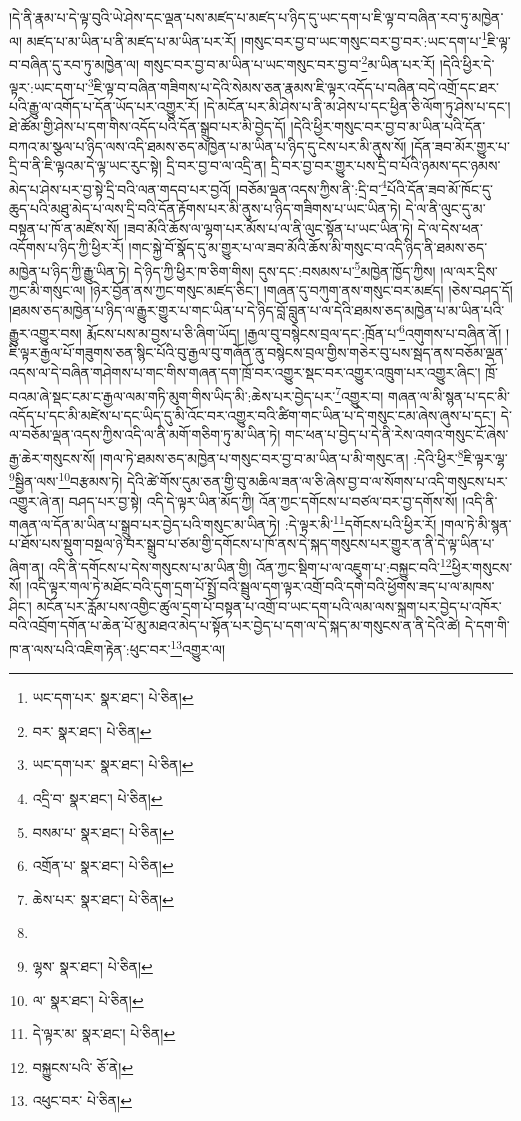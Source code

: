 །དེ་ནི་རྣམ་པ་དེ་ལྟ་བུའི་ཡེ་ཤེས་དང་ལྡན་པས་མཛད་པ་མཛད་པ་ཉིད་དུ་ཡང་དག་པ་ཇི་ལྟ་བ་བཞིན་རབ་ཏུ་མཁྱེན་ལ། མཛད་པ་མ་ཡིན་པ་ནི་མཛད་པ་མ་ཡིན་པར་རོ། །གསུང་བར་བྱ་བ་ཡང་གསུང་བར་བྱ་བར་:ཡང་དག་པ་\footnote{ཡང་དག་པར་  སྣར་ཐང་།  པེ་ཅིན། }ཇི་ལྟ་བ་བཞིན་དུ་རབ་ཏུ་མཁྱེན་ལ། གསུང་བར་བྱ་བ་མ་ཡིན་པ་ཡང་གསུང་བར་བྱ་བ་\footnote{བར་  སྣར་ཐང་།  པེ་ཅིན། }མ་ཡིན་པར་རོ། །དེའི་ཕྱིར་དེ་ལྟར་:ཡང་དག་པ་\footnote{ཡང་དག་པར་  སྣར་ཐང་།  པེ་ཅིན། }ཇི་ལྟ་བ་བཞིན་གཟིགས་པ་དེའི་སེམས་ཅན་རྣམས་ཇི་ལྟར་འདོད་པ་བཞིན་བདེ་འགྲོ་དང་ཐར་པའི་རྒྱུ་ལ་འགོད་པ་དོན་ཡོད་པར་འགྱུར་རོ། །དེ་མངོན་པར་མི་ཤེས་པ་ནི་མ་ཤེས་པ་དང་ཕྱིན་ཅི་ལོག་ཏུ་ཤེས་པ་དང་། ཐེ་ཚོམ་གྱི་ཤེས་པ་དག་གིས་འདོད་པའི་དོན་སྒྲུབ་པར་མི་བྱེད་དོ། །དེའི་ཕྱིར་གསུང་བར་བྱ་བ་མ་ཡིན་པའི་དོན་བཀའ་མ་སྩལ་པ་ཉིད་ལས་འདི་ཐམས་ཅད་མཁྱེན་པ་མ་ཡིན་པ་ཉིད་དུ་ངེས་པར་མི་ནུས་སོ། །དོན་ཟབ་མོར་གྱུར་པ་དྲི་བ་ནི་ཇི་ལྟའམ་དེ་ལྟ་ཡང་རུང་སྟེ། དྲི་བར་བྱ་བ་ལ་འདྲི་ན། དྲི་བར་བྱ་བར་གྱུར་པས་དྲི་བ་པོའི་ཉམས་དང་ཉམས་མེད་པ་ཤེས་པར་བྱ་སྟེ་དྲི་བའི་ལན་གདབ་པར་བྱའོ། །བཅོམ་ལྡན་འདས་ཀྱིས་ནི་:དྲི་བ་\footnote{འདྲི་བ་  སྣར་ཐང་།  པེ་ཅིན། }པོའི་དོན་ཟབ་མོ་ཁོང་དུ་ཆུད་པའི་མཐུ་མེད་པ་ལས་དྲི་བའི་དོན་རྟོགས་པར་མི་ནུས་པ་ཉིད་གཟིགས་པ་ཡང་ཡིན་ཏེ། དེ་ལ་ནི་ལུང་དུ་མ་བསྟན་པ་ཁོ་ན་མཛེས་སོ། །ཟབ་མོའི་ཆོས་ལ་ལྷག་པར་མོས་པ་ལ་ནི་ལུང་སྟོན་པ་ཡང་ཡིན་ཏེ། དེ་ལ་དེས་ཕན་འདོགས་པ་ཉིད་ཀྱི་ཕྱིར་རོ། །གང་སྐྱེ་བོ་སྣོད་དུ་མ་གྱུར་པ་ལ་ཟབ་མོའི་ཆོས་མི་གསུང་བ་འདི་ཉིད་ནི་ཐམས་ཅད་མཁྱེན་པ་ཉིད་ཀྱི་རྒྱུ་ཡིན་ཏེ། དེ་ཉིད་ཀྱི་ཕྱིར་ཁ་ཅིག་གིས། དུས་དང་:བསམས་པ་\footnote{བསམ་པ་  སྣར་ཐང་།  པེ་ཅིན། }མཁྱེན་ཁྱོད་ཀྱིས། །ལ་ལར་དྲིས་ཀྱང་མི་གསུང་ལ། །ཉེར་བྱོན་ནས་ཀྱང་གསུང་མཛད་ཅིང་། །གཞན་དུ་བཀུག་ནས་གསུང་བར་མཛད། །ཅེས་བཤད་དོ། །ཐམས་ཅད་མཁྱེན་པ་ཉིད་ལ་རྒྱུར་གྱུར་པ་གང་ཡིན་པ་དེ་ཉིད་བློ་བླུན་པ་ལ་དེའི་ཐམས་ཅད་མཁྱེན་པ་མ་ཡིན་པའི་རྒྱུར་འགྱུར་བས། རྨོངས་པས་མ་བྱས་པ་ཅི་ཞིག་ཡོད། །རྒྱལ་བུ་བསྙེངས་བྲལ་དང་:ཁྲོན་པ་\footnote{འགྲོན་པ་  སྣར་ཐང་།  པེ་ཅིན། }འགུགས་པ་བཞིན་ནོ། །ཇི་ལྟར་རྒྱལ་པོ་གཟུགས་ཅན་སྙིང་པོའི་བུ་རྒྱལ་བུ་གཞོན་ནུ་བསྙེངས་བྲལ་གྱིས་གཅེར་བུ་པས་སྦད་ནས་བཅོམ་ལྡན་འདས་ལ་དེ་བཞིན་གཤེགས་པ་གང་གིས་གཞན་དག་ཁྲོ་བར་འགྱུར་སྡང་བར་འགྱུར་འཁྲུག་པར་འགྱུར་ཞིང་། ཁྲོ་བའམ་ཞེ་སྡང་ངམ་ང་རྒྱལ་ལམ་གཏི་མུག་གིས་ཡིད་མི་:ཆེས་པར་བྱེད་པར་\footnote{ཆེས་པར་  སྣར་ཐང་།  པེ་ཅིན། }འགྱུར་བ། གཞན་ལ་མི་སྙན་པ་དང་མི་འདོད་པ་དང་མི་མཛེས་པ་དང་ཡིད་དུ་མི་འོང་བར་འགྱུར་བའི་ཚིག་གང་ཡིན་པ་དེ་གསུང་ངམ་ཞེས་ཞུས་པ་དང་། དེ་ལ་བཅོམ་ལྡན་འདས་ཀྱིས་འདི་ལ་ནི་མགོ་གཅིག་ཏུ་མ་ཡིན་ཏེ། གང་ཕན་པ་བྱེད་པ་དེ་ནི་རེས་འགའ་གསུང་ངོ་ཞེས་རྒྱ་ཆེར་གསུངས་སོ། །གལ་ཏེ་ཐམས་ཅད་མཁྱེན་པ་གསུང་བར་བྱ་བ་མ་ཡིན་པ་མི་གསུང་ན། :དེའི་ཕྱིར་\footnote{}ཇི་ལྟར་ལྷ་\footnote{ལྷས་  སྣར་ཐང་།  པེ་ཅིན། }སྦྱིན་ལས་\footnote{ལ་  སྣར་ཐང་།  པེ་ཅིན། }བརྩམས་ཏེ། དེའི་ཚེ་གོས་དུམ་ཅན་གྱི་བུ་མཆིལ་ཟན་ལ་ཅི་ཞེས་བྱ་བ་ལ་སོགས་པ་འདི་གསུངས་པར་འགྱུར་ཞེ་ན། བཤད་པར་བྱ་སྟེ། འདི་དེ་ལྟར་ཡིན་མོད་ཀྱི། འོན་ཀྱང་དགོངས་པ་བཙལ་བར་བྱ་དགོས་སོ། །འདི་ནི་གཞན་ལ་དོན་མ་ཡིན་པ་སྒྲུབ་པར་བྱེད་པའི་གསུང་མ་ཡིན་ཏེ། :དེ་ལྟར་མི་\footnote{དེ་ལྟར་མ་  སྣར་ཐང་།  པེ་ཅིན། }དགོངས་པའི་ཕྱིར་རོ། །གལ་ཏེ་མི་སྙན་པ་ཐོས་པས་སྡུག་བསྔལ་ཉེ་བར་སྒྲུབ་པ་ཙམ་གྱི་དགོངས་པ་ཁོ་ནས་དེ་སྐད་གསུངས་པར་གྱུར་ན་ནི་དེ་ལྟ་ཡིན་པ་ཞིག་ན། འདི་ནི་དགོངས་པ་དེས་གསུངས་པ་མ་ཡིན་གྱི། འོན་ཀྱང་སྡིག་པ་ལ་འཇུག་པ་:བསྐྱུང་བའི་\footnote{བསྐྱུངས་པའི་  ཅོ་ནེ། }ཕྱིར་གསུངས་སོ། །འདི་ལྟར་གལ་ཏེ་མཐོང་བའི་དུག་དྲག་པོ་སྤྲོ་བའི་སྦྲུལ་དག་ལྟར་འགྲོ་བའི་དགེ་བའི་ཕྱོགས་ཟད་པ་ལ་མཁས་ཤིང་། མངོན་པར་རློམ་པས་འགྱིང་ཚུལ་དྲག་པོ་བསྟན་པ་འགྲོ་བ་ཡང་དག་པའི་ལམ་ལས་སྐྲག་པར་བྱེད་པ་འཁོར་བའི་འབྲོག་དགོན་པ་ཆེན་པོ་མུ་མཐའ་མེད་པ་སྟོན་པར་བྱེད་པ་དག་ལ་དེ་སྐད་མ་གསུངས་ན་ནི་དེའི་ཚེ། དེ་དག་གི་ཁ་ན་ལས་པའི་འཇིག་རྟེན་:ཕུང་བར་\footnote{འཕུང་བར་  པེ་ཅིན། }འགྱུར་ལ། 